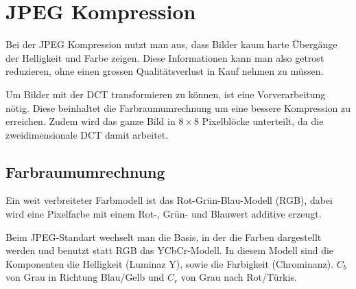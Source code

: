 %
%
%
%
\section{JPEG Kompression
\label{jpeg:section:kompjpeg}}
Bei der JPEG Kompression nutzt man aus, dass Bilder kaum harte Übergänge der Helligkeit und Farbe zeigen.
Diese Informationen kann man also getrost reduzieren, ohne einen grossen Qualitätsverlust in Kauf nehmen zu müssen. 

Um Bilder mit der DCT transformieren zu können, ist eine Vorverarbeitung nötig. 
Diese beinhaltet die Farbraumumrechnung um eine bessere Kompression zu erreichen.
Zudem wird das ganze Bild in \(8\times8\) Pixelblöcke unterteilt, da die zweidimensionale DCT damit arbeitet.

\subsection{Farbraumumrechnung
\label{jpeg:subsection:farbraumumrechnung}}
Ein weit verbreiteter Farbmodell ist das Rot-Grün-Blau-Modell (RGB), dabei wird eine Pixelfarbe mit einem Rot-, Grün- und Blauwert additive erzeugt.

Beim JPEG-Standart wechselt man die Basis, in der die Farben dargestellt werden und benutzt statt RGB das YCbCr-Modell.
In diesem Modell sind die Komponenten die Helligkeit (Luminaz Y), sowie die Farbigkeit (Chrominanz).
\(C_b\) von Grau in Richtung Blau/Gelb und \(C_r\) von Grau nach Rot/Türkis.

